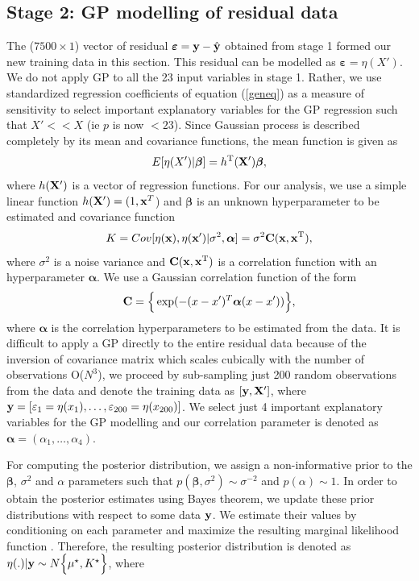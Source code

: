 \documentclass[12pt,titlepage]{report}
\newcommand{\bC}{{\bf C}}
\newcommand{\bx}{{\bf x}}
\newcommand{\bX}{{\bf X}}
\newcommand{\by}{{\bf y}}
\newcommand{\hby}{{\hat {\bf y}}}
\newcommand{\bbeta}{{\boldsymbol{\beta}}}
\theoremstyle{definition}
\theoremstyle{remark}
\begin{document}
\subsection{Stage 2: GP modelling of residual data}\label{GP}
The (${7500\times 1}$) vector of residual $\boldsymbol \varepsilon=\by-\hby$ obtained from stage 1 formed our new training data in this section. This residual can be modelled as $\boldsymbol \varepsilon= \eta(X')$. We do not apply GP to all the 23 input variables in stage 1. Rather, we use standardized regression coefficients of equation (\ref{geneq}) as a measure of sensitivity to select important explanatory variables for the GP regression such that $X'<< X$ (ie $p$ is now $<23$).
Since Gaussian process is described completely by its mean and covariance functions, the mean function is given as
\begin{equation}\label{eqgp3}
E[\eta(X')|\boldsymbol\beta]=h^{\rm T}(\bX')\boldsymbol\beta,
\end{equation}
where $h(\bX')$ is a vector of regression functions. For our analysis, we use a simple linear function $h(\bX') = (1,\bx^T$) and $\boldsymbol\beta$ is an unknown hyperparameter to be estimated and covariance function $$ K={Cov[\eta(\bx),\eta(\bx')|\sigma^{2},\boldsymbol \alpha]=\sigma^{2} \bC(\bx,\bx^{\rm T})},$$ where $\sigma^{2}$ is a noise variance and $\bC(\bx,\bx^{\rm T})$ is a correlation function with an hyperparameter $\boldsymbol \alpha$. We use a Gaussian correlation function of the form
\begin{equation}\label{gaus}
\bC=\Big \{\exp(-(x-x')^T \boldsymbol \alpha (x-x')) \Big\},%
\end{equation}
where $\boldsymbol \alpha$ is the correlation hyperparameters to be estimated from the data. It is difficult to apply a GP directly to the entire residual data because of the inversion of covariance matrix which scales cubically with the number of
observations O($N^3$), we proceed by sub-sampling just 200 random observations from the data and denote the training data as $[\by, \bX']$, where $\by=[ \varepsilon_1= \eta(x_1),\ldots, \varepsilon_{200}= \eta(x_{200})]$. We select just 4 important explanatory variables for the GP modelling and our correlation parameter is denoted as $\boldsymbol \alpha=(\alpha_1,\ldots,\alpha_4)$.

For computing the posterior distribution, we assign a non-informative prior to the $\boldsymbol \beta$, $\sigma^2$ and $\alpha$ parameters such that $p(\bbeta, \sigma^2) \sim \sigma^{-2}$ and $p(\alpha) \sim 1$.
In order to obtain the posterior estimates using Bayes theorem, we update these prior distributions with respect to some data $\by$. We estimate their values by conditioning on each parameter and maximize the resulting marginal likelihood function \citep{pd7,pd10}. Therefore, the resulting posterior distribution is denoted as $\eta(.)|\by \sim N\Big \{\mu^{\star}, K^{\star} \Big\}$, where
\end{document}
